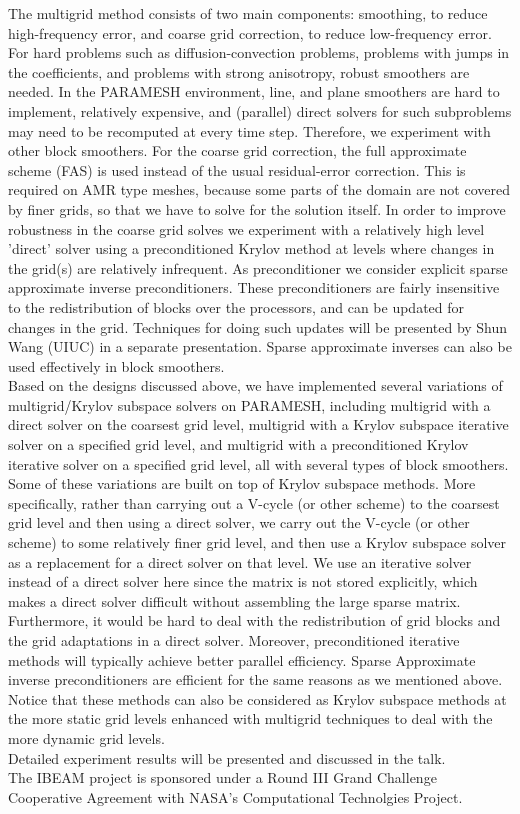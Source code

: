 \documentclass{report}
\begin{document}
The multigrid method consists of two main components: smoothing,
to reduce high-frequency error, and coarse
grid correction, to reduce low-frequency error. For hard problems such as
diffusion-convection problems, problems with
jumps in the coefficients, and problems with strong anisotropy,
robust smoothers are needed. In the PARAMESH environment, line, and plane
smoothers are hard to implement, relatively expensive, and (parallel)
direct solvers
for such subproblems may need to be recomputed at every time step.
Therefore, we experiment with other block smoothers.
For the coarse grid correction, the full approximate scheme (FAS) is used
instead of the usual residual-error correction. This is required
on AMR type meshes, because some parts of the domain are not
covered by finer grids, so that we have to solve for the solution
itself. In order to improve robustness in the coarse grid solves
we experiment with a relatively high level 'direct' solver using a
preconditioned Krylov method at levels where changes in the grid(s) are
relatively infrequent. As preconditioner we consider explicit
sparse approximate inverse preconditioners. These preconditioners are fairly
insensitive to the redistribution of blocks over the processors, and can
be updated for changes in the grid. Techniques for doing such updates will be
presented by Shun Wang (UIUC) in a separate presentation. Sparse approximate
inverses can also be used effectively in block smoothers.\\

Based on the designs discussed above, we have implemented several variations of
multigrid/Krylov subspace solvers on PARAMESH, including multigrid with a
direct solver on
the coarsest grid level, multigrid with a Krylov subspace iterative
solver on a specified grid level, and multigrid with a
preconditioned Krylov iterative solver on a specified grid level,
all with several types of block smoothers.
Some of these variations are built on top of Krylov subspace methods.
More specifically, rather than carrying out a V-cycle (or other scheme) to the coarsest
grid level and then using a direct solver, we carry out the V-cycle (or
other scheme) to some
relatively finer grid level, and then use a Krylov subspace solver as a
replacement for a direct solver on that level. We use an iterative
solver instead of a direct solver here since the matrix is not
stored explicitly, which makes a direct solver difficult without
assembling the large sparse matrix. Furthermore, it would be hard to deal with the
redistribution of grid blocks and the grid adaptations in a direct solver.
Moreover, preconditioned iterative
methods will typically achieve better parallel efficiency.
Sparse Approximate inverse preconditioners are efficient for the same
reasons as we mentioned above. Notice that these methods can also be
considered as Krylov subspace methods at the more static grid levels enhanced
with multigrid techniques to deal with the more dynamic grid levels.\\

Detailed experiment results will be presented and
discussed in the talk.\\

The IBEAM project is sponsored under a Round III Grand Challenge
Cooperative Agreement with NASA's Computational Technolgies
Project.
\end{document}
